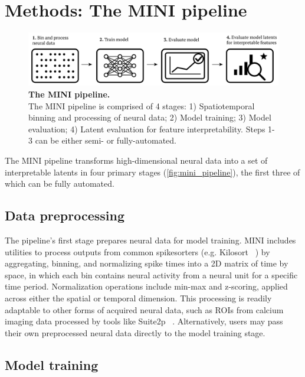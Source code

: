 \section{Methods: The MINI pipeline}

\begin{figure}[h]
    \centering
    \includegraphics[width=\linewidth]{figures/mini_pipeline.pdf}
    \caption{
        \textbf{The MINI pipeline.} \\
        \small The MINI pipeline is comprised of 4 stages: 1) Spatiotemporal binning and processing of neural data; 2) Model training; 3) Model evaluation; 4) Latent evaluation for feature interpretability. Steps 1-3 can be either semi- or fully-automated.
    }
    \label{fig:mini_pipeline}
\end{figure}

The MINI pipeline transforms high-dimensional neural data into a set of interpretable latents in four primary stages (\autoref{fig:mini_pipeline}), the first three of which can be fully automated.

\subsection{Data preprocessing}

The pipeline's first stage prepares neural data for model training. MINI includes utilities to process outputs from common spikesorters (e.g. Kilosort ~\cite{pachitariu_2016_kilosort}) by aggregating, binning, and normalizing spike times into a 2D matrix of time by space, in which each bin contains neural activity from a neural unit for a specific time period. Normalization operations include min-max and z-scoring, applied across either the spatial or temporal dimension. This processing is readily adaptable to other forms of acquired neural data, such as ROIs from calcium imaging data processed by tools like Suite2p ~\cite{pachitariu_2017_suite2p}. Alternatively, users may pass their own preprocessed neural data directly to the model training stage.

\subsection{Model training}

